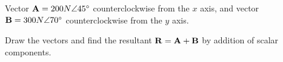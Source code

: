 
Vector ${\bf A} = 200 N \angle 45^\circ$ counterclockwise from the $x$ axis, and vector ${\bf B} = 300 N \angle 70^\circ$ counterclockwise from the $y$ axis.

Draw the vectors and find the resultant ${\bf R} = {\bf A} + {\bf B}$ by addition of scalar components.


%
%
